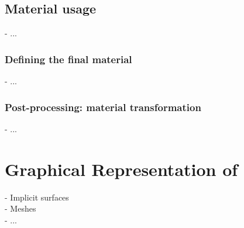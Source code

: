 \subsection{Material usage}
- ...

\subsubsection{Defining the final material}
- ...

\subsubsection{Post-processing: material transformation}
- ...

\section{Graphical Representation of }
\label{sec:volumic-modeling_graphic-representation-env-objects}
- Implicit surfaces \\
- Meshes \\
- ...
